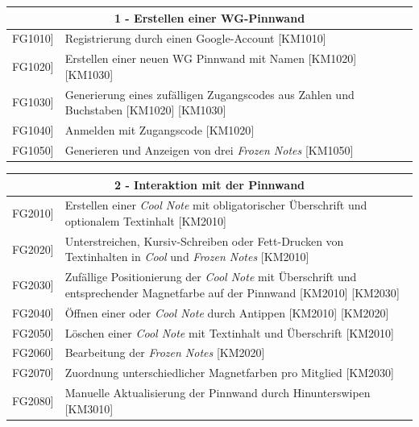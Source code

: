 \documentclass[a4paper]{scrreprt}
\begin{document}
    		\begin{table}[h!]
    			\centering
    			\label{my-label}
    			\begin{tabular}{p{2cm}p{12cm}}
    				
    				\multicolumn{2}{c}{\textbf{1 - Erstellen einer WG-Pinnwand}} \\ \hline
    				\centering{[}FG1010{]} & Registrierung durch einen Google-Account {[}KM1010{]}\\
    				\centering{[}FG1020{]}& Erstellen einer neuen WG Pinnwand mit Namen {[}KM1020{]} {[}KM1030{]}                                \\
    				\centering{[}FG1030{]}& Generierung eines zufälligen Zugangscodes aus Zahlen und Buchstaben {[}KM1020{]} {[}KM1030{]}\\ 
    				\centering{[}FG1040{]}& Anmelden mit Zugangscode {[}KM1020{]}\\ 
    				\centering{[}FG1050{]}& Generieren und Anzeigen von drei \textit{Frozen Notes} {[}KM1050{]}\\ 
    				\hline
    			\end{tabular}
    		\end{table}
    		
    		\vspace{5mm}
    		
    		\begin{table}[h!]
    			\centering
    			\label{my-label}
    			\begin{tabular}{p{2cm}p{12cm}}
    				
    				\multicolumn{2}{c}{\textbf{2 - Interaktion mit der Pinnwand}} \\ \hline
    				\centering{[}FG2010{]} & Erstellen einer \textit{Cool Note} mit obligatorischer Überschrift und optionalem Textinhalt {[}KM2010{]}\\
    				\centering{[}FG2020{]}& Unterstreichen, Kursiv-Schreiben oder Fett-Drucken von Textinhalten in \textit{Cool} und \textit{Frozen Notes} {[}KM2010{]}                              \\
    				\centering{[}FG2030{]}& Zufällige Positionierung der \textit{Cool Note} mit Überschrift und entsprechender Magnetfarbe auf der Pinnwand {[}KM2010{]} {[}KM2030{]}\\ 
    				\centering{[}FG2040{]}& Öffnen einer \texit{Frozen} oder \textit{Cool Note} durch Antippen {[}KM2010{]} {[}KM2020{]}\\ 
    				\centering{[}FG2050{]}& Löschen einer \textit{Cool Note} mit Textinhalt und Überschrift {[}KM2010{]}\\ 
    				\centering{[}FG2060{]}& Bearbeitung der \textit{Frozen Notes} {[}KM2020{]}\\ 
    				\centering{[}FG2070{]}& Zuordnung unterschiedlicher Magnetfarben pro Mitglied {[}KM2030{]}\\ 
    				\centering{[}FG2080{]}& Manuelle Aktualisierung der Pinnwand durch Hinunterswipen {[}KM3010{]}\\ 
    				\hline
    			\end{tabular}
    		\end{table}
    		
\end{document}
